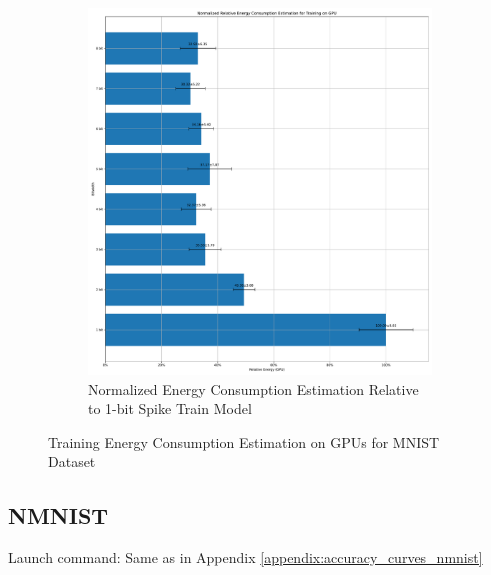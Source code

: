 \begin{figure}[H]
\begin{subfigure}[H]{0.48\textwidth}
                \includegraphics[width=\textwidth]{../standard/MNIST/plots/mnist_train_relative_energy_gpu.pdf}
                \caption{Normalized Energy Consumption Estimation Relative to 1-bit Spike Train Model}
            \end{subfigure}
            \caption{Training Energy Consumption Estimation on GPUs for MNIST Dataset}
        \end{figure}

    \subsection{NMNIST}
    \label{appendix:energy_gpu_nmnist}
        Launch command: Same as in Appendix \ref{appendix:accuracy_curves_nmnist}

